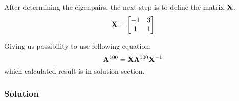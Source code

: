 After determining the eigenpairs, the next step is to define the matrix $\mathbf{X}$.
\begin{equation*}
    \mathbf{X} = 
    \begin{bmatrix}
        -1 & 3 \\
         1 & 1
    \end{bmatrix} 
\end{equation*} 

Giving us possibility to use following equation:
\begin{equation*}
    \mathbf{A}^{100} = \mathbf{X}\mathbf{\Lambda}^{100}\mathbf{X}^{-1}
\end{equation*}
which calculated result is in solution section.

\subsubsection*{Solution}


